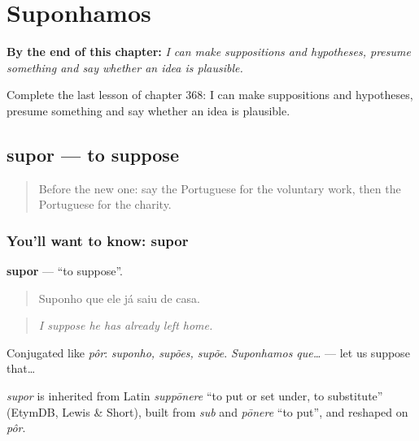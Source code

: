 
\chapter{Suponhamos}
\label{ch:pt-suponhamos}

\begin{chapteropening}
\textbf{By the end of this chapter:} \emph{I can make suppositions and hypotheses, presume something and say whether an idea is plausible.}

Complete the last lesson of chapter 368: I can make suppositions and hypotheses, presume something and say whether an idea is plausible.
\end{chapteropening}

\section[supor]{supor — to suppose}

\label{lesson:PT-C368-supor}



\begin{quote}
Before the new one: say the Portuguese for the voluntary work, then the Portuguese for the charity.
\end{quote}

\subsection*{You'll want to know: supor}
\textbf{supor} — \textquotedblleft{}to suppose\textquotedblright{}.

\begin{quote}
Suponho que ele já saiu de casa.
\end{quote}

\begin{quote}
\emph{I suppose he has already left home.}
\end{quote}

Conjugated like \emph{pôr}: \emph{suponho, supões, supõe}. \emph{Suponhamos que…} — let us suppose that…

\begin{cousinweb}
\emph{supor} is inherited from Latin \emph{suppōnere} \textquotedblleft{}to put or set under, to substitute\textquotedblright{} (EtymDB, Lewis \& Short), built from \emph{sub} and \emph{pōnere} \textquotedblleft{}to put\textquotedblright{}, and reshaped on \emph{pôr}.
\end{cousinweb}

